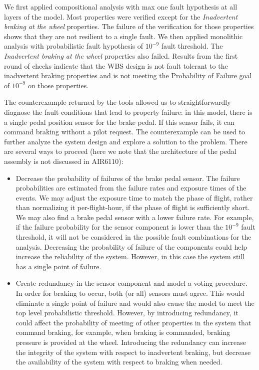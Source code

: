 We first applied compositional analysis with max one fault hypothesis at all layers of the model. Most properties were verified except for the \textit{Inadvertent braking at the wheel} properties. The failure of the verification for those properties shows that they are not resilient to a single fault. We then applied monolithic analysis with probabilistic fault hypothesis of $10^{-9}$ fault threshold. The \textit{Inadvertent braking at the wheel} properties also failed. Results from the first round of checks indicate that the WBS design is not fault tolerant to the inadvertent braking properties and is not meeting the Probability of Failure goal of $10^{-9}$ on those properties.

The counterexample returned by the tools allowed us to straightforwardly diagnose the fault conditions that lead to property failure: in this model, there is a single pedal position sensor for the brake pedal. If this sensor fails, it can command braking without a pilot request. The counterexample can be used to further analyze the system design and explore a solution to the problem. There are several ways to proceed (here we note that the architecture of the pedal assembly is not discussed in AIR6110):
	\begin{itemize}
	\renewcommand{\labelitemi}{\textbullet}
	\item Decrease the probability of failures of the brake pedal sensor. The failure probabilities are estimated from the failure rates and exposure times of the events. We may adjust the exposure time to match the phase of flight, rather than normalizing it per-flight-hour, if the phase of flight is sufficiently short. We may also find a brake pedal sensor with a lower failure rate. For example, if the failure probability for the sensor component is lower than the $10^{-9}$ fault threshold, it will not be considered in the possible fault combinations for the analysis. Decreasing the probability of failure of the components could help increase the reliability of the system. However, in this case the system still has a single point of failure.

	\item Create redundancy in the sensor component and model a voting procedure.
	In order for braking to occur, both (or all) sensors must agree. This would eliminate a single point of failure and would also cause the model to meet the top level probabilistic threshold. However, by introducing redundancy, it could affect the probability of meeting of other properties in the system that command braking, for example, when braking is commanded, braking pressure is provided at the wheel. Introducing the redundancy can increase the integrity of the system with respect to inadvertent braking, but decrease the availability of the system with respect to braking when needed.
\end{itemize}


